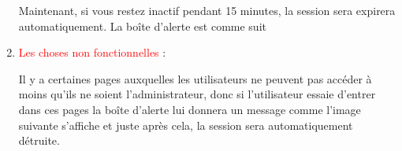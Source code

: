 \documentclass{article}
\begin{document}
\begin{enumerate}
               
    \vspace{4cm}           
               Maintenant, si vous restez inactif pendant 15 minutes, la session sera expirera automatiquement. La boîte d'alerte est comme suit
  
 \vspace{0.7cm}
               \hspace*{-0.7in}
               \noindent{}  
  
  
  
  
  
  
	\vspace{3cm}
\item \textcolor{red}{\huge Les choses non fonctionnelles} :  
  
  Il y a certaines pages auxquelles les utilisateurs ne peuvent pas accéder à moins qu'ils ne soient l'administrateur, donc si l'utilisateur essaie d'entrer dans ces pages la boîte d'alerte lui donnera un message comme l'image suivante s'affiche et juste après cela, la session sera automatiquement détruite.
  
   
  
\vspace{0.7cm}
               \hspace*{-0.7in}
               \noindent{} 



\end{enumerate}
\end{document}

